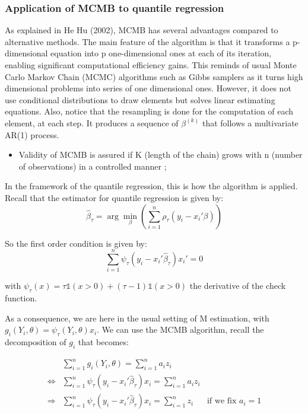 \documentclass[11pt]{article}
\begin{document}
	
		
		\subsubsection{Application of MCMB to quantile regression}

As explained in He Hu (2002), MCMB has several advantages compared to alternative methods. The main feature of the algorithm is that it transforms a p-dimensional equation into p one-dimensional ones at each of its iteration, enabling significant computational efficiency gains. This reminds of usual Monte Carlo Markov Chain (MCMC) algorithms such as Gibbs samplers as it turns high dimensional problems into series of one dimensional ones. However, it does not use conditional distributions to draw elements but solves linear estimating equations. Also, notice that the resampling is done for the computation of each element, at each step. It produces a sequence of $\beta^{(k)}$ that follows a multivariate AR(1) process. 
\smallskip


\begin{itemize}
\item Validity of MCMB is assured if K (length of the chain) grows with n (number of observations) in a controlled manner ;
\end{itemize}

In the framework of the quantile regression, this is how the algorithm is applied. Recall that the estimator for quantile regression is given by:
\begin{equation}
\hat{\beta}_{\tau} = \arg\min_{\beta}\left(\sum_{i=1}^{n} \rho_{\tau}(y_{i}-x_{i}'\beta) \right)
\end{equation}

So the first order condition is given by:
\begin{equation}
\sum_{i=1}^{n} \psi_{\tau}(y_{i}-x_{i}'\hat{\beta}_{\tau})x_{i}' = 0
\end{equation}

with $\psi_{\tau}(x)=\tau\mathds{1}(x>0)+(\tau-1)\mathds{1}(x>0)$ the derivative of the check function.\bigskip

As a consequence, we are here in the usual setting of M estimation, with $g_{i}(Y_{i}, \theta)=\psi_{\tau}(Y_{i},\theta)x_{i}$. We can use the MCMB algorithm, recall the decomposition of $g_{i}$ that becomes:


\begin{align*}
&\sum_{i=1}^{n}g_{i}(Y_{i}, \theta)=\sum_{i=1}^{n}a_{i}z_{i} &\\
\Leftrightarrow &\sum_{i=1}^{n}\psi_{\tau}(y_{i}-x_{i}'\hat{\beta}_{\tau})x_{i} = \sum_{i=1}^{n}a_{i}z_{i}&\\
\Rightarrow &\sum_{i=1}^{n}\psi_{\tau}(y_{i}-x_{i}'\hat{\beta}_{\tau})x_{i} = \sum_{i=1}^{n}z_{i} &\text{if we fix }a_{i}=1\\
\end{align*}
\end{document}
